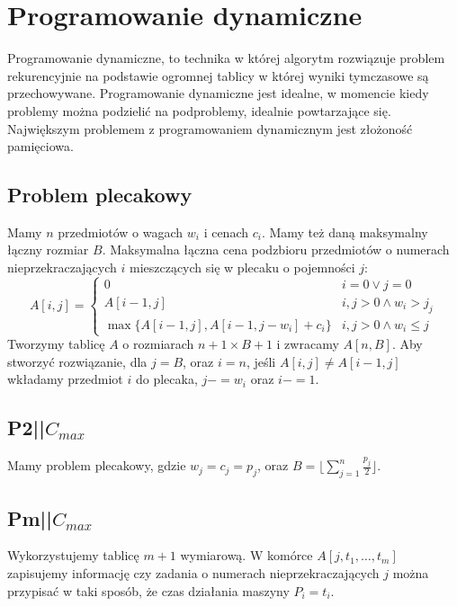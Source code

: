 \documentclass{../notatki}
\begin{document}
\section{Programowanie dynamiczne}

Programowanie dynamiczne, to technika w której algorytm rozwiązuje problem
rekurencyjnie na podstawie ogromnej tablicy w której wyniki tymczasowe są
przechowywane. Programowanie dynamiczne jest idealne, w momencie kiedy
problemy można podzielić na podproblemy, idealnie powtarzające się. Największym
problemem z programowaniem dynamicznym jest złożoność pamięciowa.

\subsection{Problem plecakowy}

Mamy $n$ przedmiotów o wagach $w_i$ i cenach $c_i$. Mamy też daną maksymalny
łączny rozmiar $B$.
Maksymalna łączna cena podzbioru przedmiotów o numerach nieprzekraczających
$i$ mieszczących się w plecaku o pojemności $j$:
$$
A[i, j] =
\begin{cases}
  0 & i = 0 \lor j = 0 \\
  A[i - 1,j] & i,j > 0 \land w_i > j_j \\
  \max\{A[i - 1,j], A[i - 1,j - w_i] + c_i\} & i,j > 0 \land w_i \leq j
\end{cases}
$$
Tworzymy tablicę $A$ o rozmiarach $n + 1 \times B + 1$ i zwracamy $A[n,B]$.
Aby stworzyć rozwiązanie, dla $j = B$, oraz $i = n$, jeśli $A[i, j]
\neq A[i - 1, j]$ wkładamy
przedmiot $i$ do plecaka, $j -= w_i$ oraz $i -= 1$.

\subsection{P2||\texorpdfstring{$C_{max}$}{Cmax}}

Mamy problem plecakowy, gdzie $w_j = c_j = p_j$, oraz $B = \lfloor
\sum_{j=1}^{n} \frac{p_j}{2} \rfloor$.

\subsection{Pm||\texorpdfstring{$C_{max}$}{Cmax}}

Wykorzystujemy tablicę $m + 1$ wymiarową. W komórce $A[j, t_1, \dots,
t_m]$ zapisujemy informację czy zadania o numerach
nieprzekraczających $j$ można przypisać w taki sposób, że czas
działania maszyny $P_i = t_i$.
\end{document}
